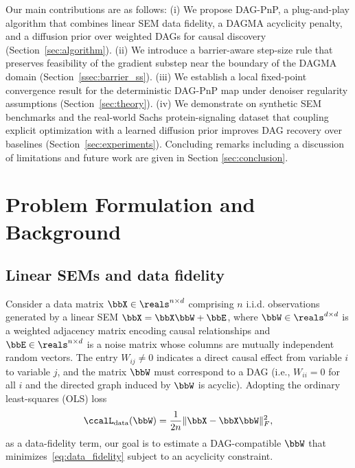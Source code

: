 \documentclass[conference]{IEEEtran}
\newcommand{\Ldata}{\ccalL_{\mathrm{data}}}
\begin{document}
	\vspace{1mm}
	Our main contributions are as follows:
	(i) We propose DAG-PnP, a plug-and-play algorithm that combines linear SEM data fidelity, a DAGMA acyclicity penalty, and a diffusion prior over weighted DAGs for causal discovery (Section~\ref{sec:algorithm}).
	(ii) We introduce a barrier-aware step-size rule that preserves feasibility of the gradient substep near the boundary of the DAGMA domain (Section~\ref{ssec:barrier_ss}).
	(iii) We establish a local fixed-point convergence result for the deterministic DAG-PnP map under denoiser regularity assumptions (Section~\ref{sec:theory}).
	(iv) We demonstrate on synthetic SEM benchmarks and the real-world Sachs protein-signaling dataset that coupling explicit optimization with a learned diffusion prior improves DAG recovery over baselines (Section~\ref{sec:experiments}). Concluding remarks including a discussion of limitations and future work are given in Section \ref{sec:conclusion}.
	
	\section{Problem Formulation and Background}
	\label{sec:background}
	
	\subsection{Linear SEMs and data fidelity}
	
	Consider a data matrix $\bbX \in \reals^{n \times d}$ comprising $n$ i.i.d. observations generated by a linear SEM $\bbX = \bbX \bbW + \bbE$, where $\bbW \in \reals^{d \times d}$ is a weighted adjacency matrix encoding causal relationships and $\bbE \in \reals^{n \times d}$ is a noise matrix whose columns are mutually independent random vectors.
    The entry $W_{ij} \neq 0$ indicates a direct causal effect from variable $i$ to variable $j$, and the matrix $\bbW$ must correspond to a DAG (i.e., $W_{ii} = 0$ for all $i$ and the directed graph induced by $\bbW$ is acyclic). Adopting the ordinary least-squares (OLS) loss
	\begin{equation}\label{eq:data_fidelity}
		\Ldata(\bbW) = \frac{1}{2n} \| \bbX - \bbX \bbW \|_F^2,
	\end{equation}
	as a data-fidelity term, our goal is to estimate a DAG-compatible $\bbW$ that minimizes~\eqref{eq:data_fidelity} subject to an acyclicity constraint. 
	
\end{document}
